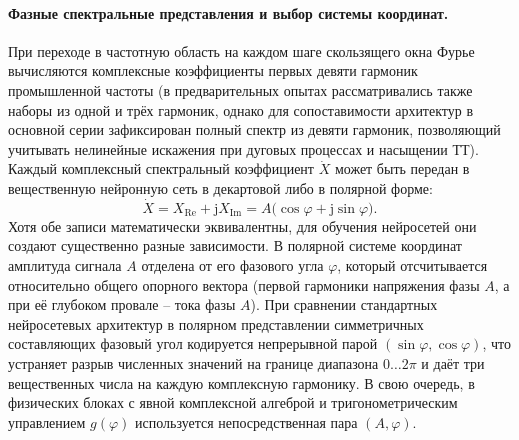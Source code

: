 \paragraph{Фазные спектральные представления и выбор системы координат.}
При переходе в частотную область на каждом шаге скользящего окна Фурье
вычисляются комплексные коэффициенты первых девяти гармоник промышленной
частоты (в предварительных опытах рассматривались также наборы из одной и
трёх гармоник, однако для сопоставимости архитектур в основной серии
зафиксирован полный спектр из девяти гармоник, позволяющий учитывать
нелинейные искажения при дуговых процессах и насыщении ТТ). Каждый
комплексный спектральный коэффициент $\dot{X}$ может быть передан в
вещественную нейронную сеть в декартовой либо в полярной форме:
\begin{equation}
 \dot{X}=X_{\mathrm{Re}}+\mathrm{j}X_{\mathrm{Im}}
        =A\bigl(\cos\varphi+\mathrm{j}\sin\varphi\bigr).
 \label{eq:ch4_feature_coordinates}
\end{equation}
Хотя обе записи математически эквивалентны, для обучения нейросетей они
создают существенно разные зависимости. В полярной системе координат
амплитуда сигнала $A$ отделена от его фазового угла $\varphi$, который
отсчитывается относительно общего опорного вектора (первой гармоники
напряжения фазы $A$, а при её глубоком провале -- тока фазы $A$). При
сравнении стандартных нейросетевых архитектур в полярном представлении
симметричных составляющих фазовый угол кодируется непрерывной парой
$(\sin\varphi, \cos\varphi)$, что устраняет разрыв численных значений на
границе диапазона $0\dots 2\pi$ и даёт три вещественных числа на каждую
комплексную гармонику. В свою очередь, в физических блоках с явной
комплексной алгеброй и тригонометрическим управлением $g(\varphi)$
используется непосредственная пара $(A, \varphi)$.


